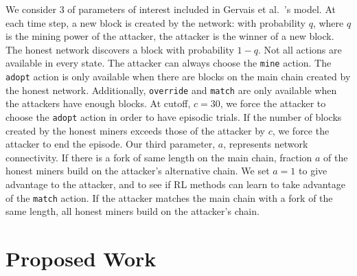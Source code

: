  We consider 3 of parameters of interest included in Gervais et al.~\cite{Gervais:2016}'s model. At each time step, a new block is created by the network: with probability $q$, where $q$ is the mining power of the attacker, the attacker is the winner of a new block. The honest network discovers a block with probability $1-q$. Not all actions are available in every state. The attacker can always choose the \texttt{mine} action. The \texttt{adopt} action is only available when there are blocks on the main chain created by the honest network. Additionally, \texttt{override} and \texttt{match} are only available when the attackers have enough blocks. At cutoff, $c=30$, we force the attacker to choose the \texttt{adopt} action in order to have episodic trials. If the number of blocks created by the honest miners exceeds those of the attacker by $c$, we force the attacker to end the episode. Our third parameter, $a$, represents network connectivity. If there is a fork of same length on the main chain, fraction $a$ of the honest miners build on the attacker's alternative chain. We set $a=1$ to give advantage to the attacker, and to see if RL methods can learn to take advantage of the \texttt{match} action. If the attacker matches the main chain with a fork of the same length, all honest miners build on the attacker's chain. 

\section{Proposed Work}

